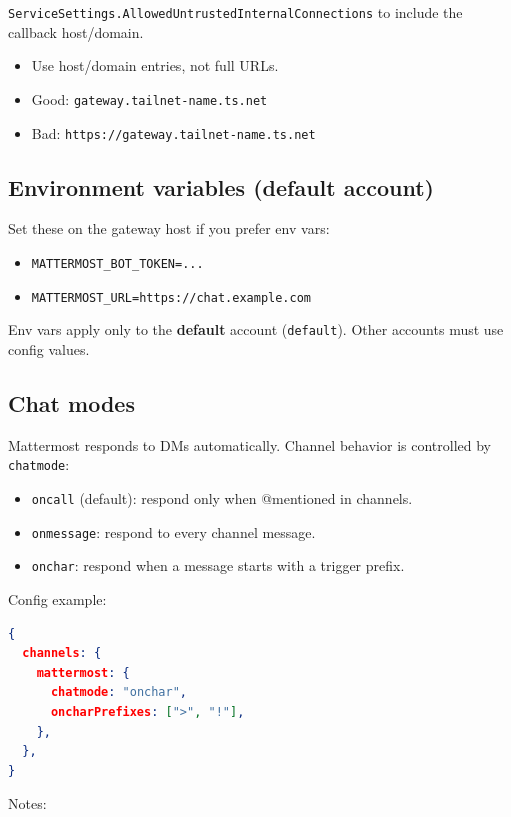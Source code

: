 \texttt{ServiceSettings.AllowedUntrustedInternalConnections} to include the callback host/domain.
\begin{itemize}
  \item Use host/domain entries, not full URLs.
  \item Good: \texttt{gateway.tailnet-name.ts.net}
  \item Bad: \texttt{https://gateway.tailnet-name.ts.net}
\end{itemize}


\subsection{Environment variables (default account)}


Set these on the gateway host if you prefer env vars:

\begin{itemize}
  \item \texttt{MATTERMOST\_BOT\_TOKEN=...}
  \item \texttt{MATTERMOST\_URL=https://chat.example.com}
\end{itemize}


Env vars apply only to the \textbf{default} account (\texttt{default}). Other accounts must use config values.

\subsection{Chat modes}


Mattermost responds to DMs automatically. Channel behavior is controlled by \texttt{chatmode}:

\begin{itemize}
  \item \texttt{oncall} (default): respond only when @mentioned in channels.
  \item \texttt{onmessage}: respond to every channel message.
  \item \texttt{onchar}: respond when a message starts with a trigger prefix.
\end{itemize}


Config example:

\begin{lstlisting}[language=json]
{
  channels: {
    mattermost: {
      chatmode: "onchar",
      oncharPrefixes: [">", "!"],
    },
  },
}
\end{lstlisting}


Notes:

